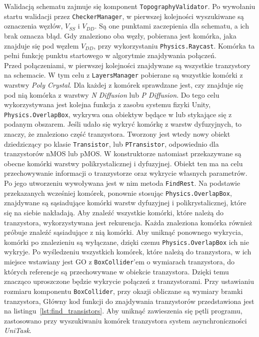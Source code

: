 Walidacją schematu zajmuje się komponent \texttt{TopographyValidator}.
Po wywołaniu startu walidacji przez \texttt{CheckerManager},
w pierwszej kolejności wyszukiwane są oznaczenia węzłów, $V_{SS}$ i $V_{DD}$.
Są one punktami zaczepienia dla schematu, a ich brak oznacza błąd.
Gdy znaleziono oba węzły, pobierana jest komórka, jaka znajduje się pod węzłem $V_{DD}$,
przy wykorzystaniu \texttt{Physics.Raycast}.
Komórka ta pełni funkcję punktu startowego w algorytmie znajdywania połączeń.\\
\indent Przed połączeniami, w pierwszej kolejności znajdywane są wszystkie tranzystory na schemacie.
W tym celu z \texttt{LayersManager} pobierane są wszystkie komórki z warstwy \textit{Poly Crystal}.
Dla każdej z komórek sprawdzane jest, 
czy znajduje się pod nią komórka z warstwy \textit{N Diffusion} lub \textit{P Diffusion}.
Do tego celu wykorzystywana jest kolejna funkcja z zasobu systemu fizyki Unity, \texttt{Physics.OverlapBox},
wykrywa ona obiektyw będące w lub stykające się z podanym obszarem.
Jeśli udało się wykryć komórkę z warstw dyfuzyjnych, to znaczy, że znaleziono część tranzystora.
Tworzony jest wtedy nowy obiekt dziedziczący po klasie \texttt{Transistor},  lub \texttt{PTransistor},
odpowiednio dla tranzystorów nMOS lub pMOS.
W konstruktorze natomiast przekazywane są obecne komórki warstwy polikrystalicznej i dyfuzyjnej.
Obiekt ten ma na celu przechowywanie informacji o tranzystorze oraz wykrycie własnych parametrów.
Po jego utworzeniu wywoływana jest w nim metoda \texttt{FindRest}.
Na podstawie przekazanych wcześniej komórek, ponownie stosując \texttt{Physics.OverlapBox},
znajdywane są sąsiadujące komórki warstw dyfuzyjnej i polikrystalicznej, które się na siebie nakładają.
Aby znaleźć wszystkie komórki, które należą do tranzystora, wykorzystywana jest rekurencja.
Każda znaleziona komórka również próbuje znaleźć sąsiadujące z nią komórki.
Aby uniknąć ponownego wykrycia, komórki po znalezieniu są wyłączane,
dzięki czemu \texttt{Physics.OverlapBox} ich nie wykryje.
Po wyśledzeniu wszystkich komórek, które należą do tranzystora,
w ich miejsce wstawiany jest GO z \texttt{BoxCollider}'em o wymiarach tranzystora,
do których referencje są przechowywane w obiekcie tranzystora.
Dzięki temu znacząco uproszczone będzie wykrycie połączeń z tranzystorami.
Przy ustawianiu rozmiaru komponentu \texttt{BoxCollider}, przy okazji obliczane są wymiary bramki tranzystora,
Główny kod funkcji do znajdywania tranzystorów przedstawiona jest na listingu~\ref{lst:find_transistors}.
Aby uniknąć zawieszenia się pętli programu,
zastosowano przy wyszukiwaniu komórek tranzystora system asynchroniczności \textit{UniTask}.

